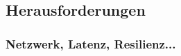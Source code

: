 \subsection{Herausforderungen}
\label{subsec:herausforderungen}

\subsubsection{Netzwerk, Latenz, Resilienz...}